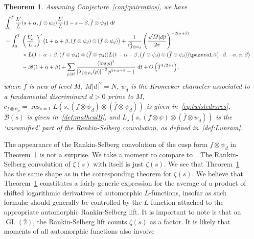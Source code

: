 \documentclass[11pt,reqno]{amsart} \usepackage{fullpage}
\newtheorem{theorem}[lemma]{Theorem}
\newcommand{\vep}{\varepsilon}
\renewcommand{\d}[1]{\,\operatorname*{d}\!{#1}}
\newcommand\be{\begin{equation}}
\newcommand\ee{\end{equation}}
\newcommand{\GL}{\operatorname{GL}}
\DeclareMathOperator{\res}{res}
\newcommand{\Lunram}{L_{\star}}
\numberwithin{equation}{section}
\begin{document}
\begin{theorem}\label{thm:pairlogderiv}
  Assuming Conjecture~\ref{conj:pairratios}, we have
  \be\begin{aligned}[b]
    &\int_0^T \frac{L'}{L}(s+\alpha,f\otimes\psi_d)
    \frac{L'}{L}(1-s+\beta,\overline f\otimes\psi_d)\d t \\
    &=\int_0^T\begin{aligned}[t]
      &\left(\frac{\Lunram'}\Lunram\right)'
      \left(1+\alpha+\beta,(f\otimes\psi_d)\otimes(\overline f\otimes\psi_d)\right)
      +\frac{1}{c_{f\otimes\psi_d}^2}
      \left(\frac{\sqrt M|d|t}{2\pi}\right)^{-2(\alpha+\beta)} \\
      &\times L(1+\alpha+\beta,(f\otimes\psi_d)\otimes(\overline f\otimes\psi_d))
      L(1-\alpha-\beta,(f\otimes\psi_d)\otimes(\overline f\otimes\psi_d))
      \pazocal A(-\beta,-\alpha,\alpha,\beta) \\
      &-\mathcal B(1+\alpha+\beta)
      +\sum_{p\mid M}\frac{(\log p)^2}
      {\left|\lambda_{f\otimes\psi_d}(p)\right|^{-2}p^{1+\alpha+\beta}-1}\d t
      +O\left(T^{1/2+\vep}\right),
    \end{aligned}\end{aligned}\ee where
  $f$ is new of level $M$, $M|d|^2=N$, $\psi_d$ is the Kronecker character associated to
  a fundamental discriminant $d>0$ prime to $M$,
  $c_{f\otimes\psi_d}=\res_{s=1}L(s,(f\otimes\psi_d)\otimes(\overline f\otimes\psi_d))$
  is given in~\eqref{eq:twistedrsres}, $\mathcal B(s)$ is given in~\eqref{def:mathcalB},
  and $\Lunram(s,(f\otimes\psi)\otimes(\overline f\otimes\psi_d))$ is the `unramified' part
  of the Rankin-Selberg convolution, as defined in~\eqref{def:Lunram}.
\end{theorem}
The appearance of the Rankin-Selberg convolution of the cusp form $f\otimes\psi_d$ in
Theorem~\ref{thm:pairlogderiv} is not a surprise. We take a moment to compare
to~\cite[Theorem 2.5]{CS}. The Rankin-Selberg convolution of $\zeta(s)$ with itself is just
$\zeta(s)$. We see that Theorem~\ref{thm:pairlogderiv} has the same shape as
in the corresponding theorem for $\zeta(s)$. We believe that Theorem~\ref{thm:pairlogderiv}
constitutes a fairly generic expression for the average of a product of shifted logarithmic
derivatives of automorphic $L$-functions, insofar as such formulæ should generally be
controlled by the $L$-function attached to the appropriate automorphic Rankin-Selberg lift.
It is important to note is that on $\GL(2)$, the Rankin-Selberg lift counts $\zeta(s)$
as a factor. It is likely that moments of all automorphic functions also involve
\end{document}
